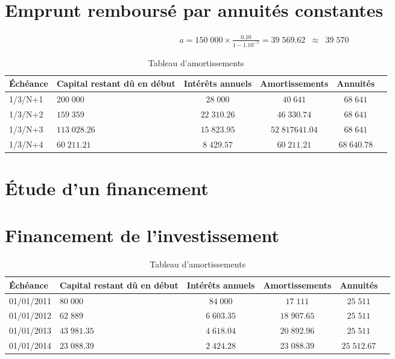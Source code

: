 \documentclass{article}
\begin{document}
	\section{Emprunt remboursé par annuités constantes}
\begin{eqnarray*}
	a = 150\;000 \times \frac{0.10}{1-1.10^{-5}} = 39\;569.62 &\approx& 39\;570
\end{eqnarray*}
	\begin{table}[H]
		\centering
		\begin{tabular}{|p{2cm}|p{2.8cm}|c|c|c|p{2.8cm}|}
			\hline
			\textbf{Échéance} & \textbf{Capital restant dû en début } & \textbf{Intérêts annuels} & \textbf{Amortissements}& \textbf{Annuités} \\
			\hline
			1/3/N+1 & $200\;000$&$28\;000$& $40\;641$ & $68\;641$\\ 
			\hline
			1/3/N+2 & $159\;359$&$22\;310.26$& $46\;330.74$ & $68\;641$\\ 	
			\hline
			1/3/N+3 & $113\;028.26$&$15\;823.95$& $52\;817641.04$ & $68\;641$\\ 
			\hline
			1/3/N+4 & $60\;211.21$&$8\;429.57$& $60\;211.21$ & $68\;640.78$\\ 
			\hline
		\end{tabular}
		\caption{Tableau d'amortissements}
	\end{table}
	\section{Étude d'un financement}
	\section{Financement de l'investissement}
	\begin{table}[H]
		\centering
		\begin{tabular}{|p{2cm}|p{2.8cm}|c|c|c|p{2.8cm}|}
			\hline
			\textbf{Échéance} & \textbf{Capital restant dû en début } & \textbf{Intérêts annuels} & \textbf{Amortissements}& \textbf{Annuités} \\
			\hline
			01/01/2011 & $80\;000$		& $84\;000$		&	$17\;111$		&	$25\;511$\\
			\hline
			01/01/2012 & $62\;889$		& $6\;603.35$	&	$18\;907.65$	&	$25\;511$\\
			\hline
			01/01/2013 & $43\;981.35$	& $4\;618.04$	&	$20\;892.96$	&	$25\;511$\\
			\hline
			01/01/2014 & $23\;088.39$	& $2\;424.28$	&	$23\;088.39$	&	$25\;512.67$\\
			\hline
		\end{tabular}
		\caption{Tableau d'amortissements}
	\end{table}
\end{document}
